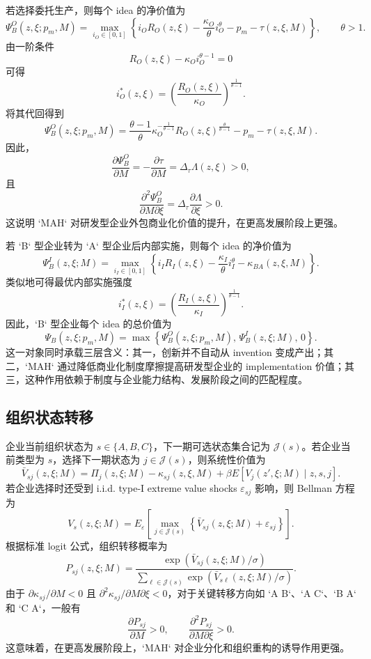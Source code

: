 若选择委托生产，则每个 idea 的净价值为
\[
\Psi_B^O(z,\xi;p_m,M)
=
\max_{i_O \in [0,1]}
\left\{
i_O R_O(z,\xi)-\frac{\kappa_O}{\theta}i_O^\theta-p_m-\tau(z,\xi,M)
\right\},
\qquad \theta>1.
\]
由一阶条件
\[
R_O(z,\xi)-\kappa_O i_O^{\theta-1}=0
\]
可得
\[
i_O^*(z,\xi)=\left(\frac{R_O(z,\xi)}{\kappa_O}\right)^{\frac{1}{\theta-1}}.
\]
将其代回得到
\[
\Psi_B^O(z,\xi;p_m,M)
=
\frac{\theta-1}{\theta}\kappa_O^{-\frac{1}{\theta-1}}
R_O(z,\xi)^{\frac{\theta}{\theta-1}}
-p_m-\tau(z,\xi,M).
\]
因此，
\[
\frac{\partial \Psi_B^O}{\partial M}
=-\frac{\partial \tau}{\partial M}
=\Delta_{\tau}\Lambda(z,\xi)>0,
\]
且
\[
\frac{\partial^2 \Psi_B^O}{\partial M \partial \xi}
=\Delta_{\tau}\frac{\partial \Lambda}{\partial \xi}>0.
\]
这说明 `MAH` 对研发型企业外包商业化价值的提升，在更高发展阶段上更强。

若 `B` 型企业转为 `A` 型企业后内部实施，则每个 idea 的净价值为
\[
\Psi_B^I(z,\xi;M)
=
\max_{i_I \in [0,1]}
\left\{
i_I R_I(z,\xi)-\frac{\kappa_I}{\theta}i_I^\theta-\kappa_{BA}(z,\xi,M)
\right\}.
\]
类似地可得最优内部实施强度
\[
i_I^*(z,\xi)=\left(\frac{R_I(z,\xi)}{\kappa_I}\right)^{\frac{1}{\theta-1}}.
\]
因此，`B` 型企业每个 idea 的总价值为
\[
\Psi_B(z,\xi;p_m,M)
=
\max\left\{
\Psi_B^O(z,\xi;p_m,M),\,
\Psi_B^I(z,\xi;M),\,
0
\right\}.
\]
这一对象同时承载三层含义：其一，创新并不自动从 invention 变成产出；其二，`MAH` 通过降低商业化制度摩擦提高研发型企业的 implementation 价值；其三，这种作用依赖于制度与企业能力结构、发展阶段之间的匹配程度。

\subsection{组织状态转移}

企业当前组织状态为 $s \in \{A,B,C\}$，下一期可选状态集合记为 $\mathcal{J}(s)$。若企业当前类型为 $s$，选择下一期状态为 $j \in \mathcal{J}(s)$，则系统性价值为
\[
\bar V_{sj}(z,\xi;M)
=
\Pi_j(z,\xi;M)-\kappa_{sj}(z,\xi,M)
+\beta E[V_j(z',\xi;M)\mid z,s,j].
\]
若企业选择时还受到 i.i.d. type-I extreme value shocks $\varepsilon_{sj}$ 影响，则 Bellman 方程为
\[
V_s(z,\xi;M)
=
E_{\varepsilon}
\left[
\max_{j\in \mathcal{J}(s)}
\left\{
\bar V_{sj}(z,\xi;M)+\varepsilon_{sj}
\right\}
\right].
\]
根据标准 logit 公式，组织转移概率为
\[
P_{sj}(z,\xi;M)
=
\frac{\exp(\bar V_{sj}(z,\xi;M)/\sigma)}
{\sum_{\ell \in \mathcal{J}(s)}\exp(\bar V_{s\ell}(z,\xi;M)/\sigma)}.
\]
由于 $\partial \kappa_{sj}/\partial M<0$ 且 $\partial^2 \kappa_{sj}/\partial M \partial \xi<0$，对于关键转移方向如 `A \to B`、`A \to C`、`B \to A` 和 `C \to A`，一般有
\[
\frac{\partial P_{sj}}{\partial M}>0,
\qquad
\frac{\partial^2 P_{sj}}{\partial M \partial \xi}>0.
\]
这意味着，在更高发展阶段上，`MAH` 对企业分化和组织重构的诱导作用更强。


